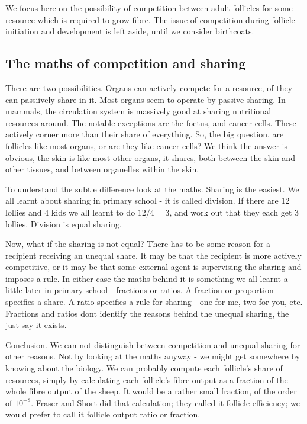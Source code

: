 \documentclass[titlepage]{article}  %
\begin{document}
We focus here on the possibility of competition between adult follicles for some resource which is required to grow fibre.  The issue of competition during follicle initiation and development is left aside, until we consider birthcoats.

\subsection{The maths of competition and sharing}
There are two possibilities. Organs can actively compete for a resource, of they can passiively share in it. Most organs seem to operate by passive sharing. In mammals, the circulation system is massively good at sharing nutritional resources around. The notable exceptions are the foetus, and cancer cells. These actively corner more than their share of everything. So, the big question, are follicles like most organs, or are they like cancer cells? We think the answer is obvious, the skin is like most other organs, it shares, both between the skin and other tissues, and between organelles within the skin. 

To understand the subtle difference look at the maths. Sharing is the easiest. We all learnt about sharing in primary school - it is called division.  If there are 12 lollies and 4 kids we all learnt to do $12/4 = 3$, and work out that they each get 3 lollies. Division is equal sharing.

Now, what if the sharing is not equal? There has to be some reason for a recipient receiving an unequal share. It may be that the recipient is more actively competitive, or it may be that some external agent is supervising the sharing and imposes a rule. In either case the maths behind it is something we all learnt a little later in primary school - fractions or ratios.  A fraction or proportion specifies a share. A ratio specifies a rule for sharing - one for me, two for you, etc. Fractions and ratios dont identify the reasons behind the unequal sharing, the just say it exists.

Conclusion. We can not distinguish between competition and unequal sharing for other reasons. Not by looking at the maths anyway - we might get somewhere by knowing about the biology. We can probably compute each follicle's share of resources, simply by calculating each follicle's fibre output as a fraction of the whole fibre output of the sheep. It would be a rather small fraction, of the order of $10^{-8}$. Fraser and Short did that calculation; they called it follicle efficiency; we would prefer to call it follicle output ratio or fraction.
\end{document}

